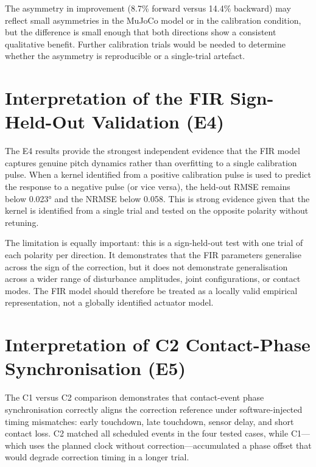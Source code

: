 \documentclass[12pt,a4paper]{report}
\begin{document}
The asymmetry in improvement (8.7\% forward versus 14.4\% backward) may reflect small asymmetries in the MuJoCo model or in the calibration condition, but the difference is small enough that both directions show a consistent qualitative benefit. Further calibration trials would be needed to determine whether the asymmetry is reproducible or a single-trial artefact.
 
\section{Interpretation of the FIR Sign-Held-Out Validation (E4)}
 
The E4 results provide the strongest independent evidence that the FIR model captures genuine pitch dynamics rather than overfitting to a single calibration pulse. When a kernel identified from a positive calibration pulse is used to predict the response to a negative pulse (or vice versa), the held-out RMSE remains below \ang{0.023} and the NRMSE below 0.058. This is strong evidence given that the kernel is identified from a single trial and tested on the opposite polarity without retuning.
 
The limitation is equally important: this is a sign-held-out test with one trial of each polarity per direction. It demonstrates that the FIR parameters generalise across the sign of the correction, but it does not demonstrate generalisation across a wider range of disturbance amplitudes, joint configurations, or contact modes. The FIR model should therefore be treated as a locally valid empirical representation, not a globally identified actuator model.
 
\section{Interpretation of C2 Contact-Phase Synchronisation (E5)}
 
The C1 versus C2 comparison demonstrates that contact-event phase synchronisation correctly aligns the correction reference under software-injected timing mismatches: early touchdown, late touchdown, sensor delay, and short contact loss. C2 matched all scheduled events in the four tested cases, while C1---which uses the planned clock without correction---accumulated a phase offset that would degrade correction timing in a longer trial.
 
\end{document}
